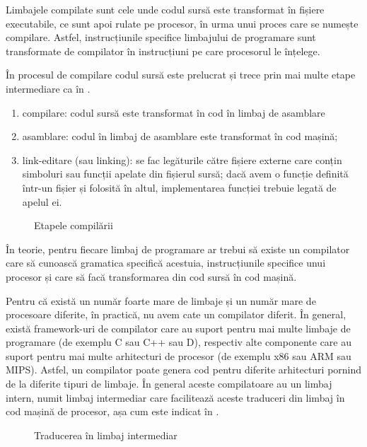 Limbajele compilate sunt cele unde codul sursă este transformat în fișiere
executabile, ce sunt apoi rulate pe procesor, în urma unui proces care se
numește compilare. Astfel, instrucțiunile specifice limbajului de programare
sunt transformate de compilator în instrucțiuni pe care procesorul le înțelege.

În procesul de compilare codul sursă este prelucrat și trece prin mai multe
etape intermediare ca în .

\begin{enumerate}
	\item compilare: codul sursă este transformat în cod în limbaj de
		asamblare
	\item asamblare: codul în limbaj de asamblare este transformat în cod
		mașină;
        \item link-editare (sau linking): se fac legăturile către fișiere externe care conțin
		simboluri sau funcții apelate din fișierul sursă; dacă avem o
		funcție definită într-un fișier și folosită în altul,
		implementarea funcției trebuie legată de apelul ei.
\end{enumerate}

\begin{figure}[htbp]
  \centering
  \def\svgwidth{0.6\columnwidth}
  
  \caption{Etapele compilării}
  \label{fig:appdev:compile-phases}
\end{figure}

În teorie, pentru fiecare limbaj de programare ar trebui să existe un compilator
care să cunoască gramatica specifică acestuia, instrucțiunile
specifice unui procesor și care să facă transformarea din cod sursă în cod
mașină.

Pentru că există un număr foarte mare de limbaje și un număr mare de procesoare
diferite, în practică, nu avem cate un compilator diferit. În general, există
framework-uri de compilator care au suport pentru mai multe limbaje de programare (de exemplu C sau C++ sau D), respectiv alte
componente care au suport pentru mai multe arhitecturi de procesor (de exemplu x86 sau ARM sau MIPS). Astfel, un compilator poate genera cod pentru diferite arhitecturi pornind de la diferite tipuri de limbaje. În general aceste compilatoare au un limbaj intern, numit limbaj intermediar care facilitează aceste traduceri din limbaj în cod mașină de procesor, așa cum este indicat în .

\begin{figure}[htbp]
  \centering
  \def\svgwidth{0.6\columnwidth}
  
  \caption{Traducerea în limbaj intermediar}
  \label{fig:appdev:intermediary}
\end{figure}

